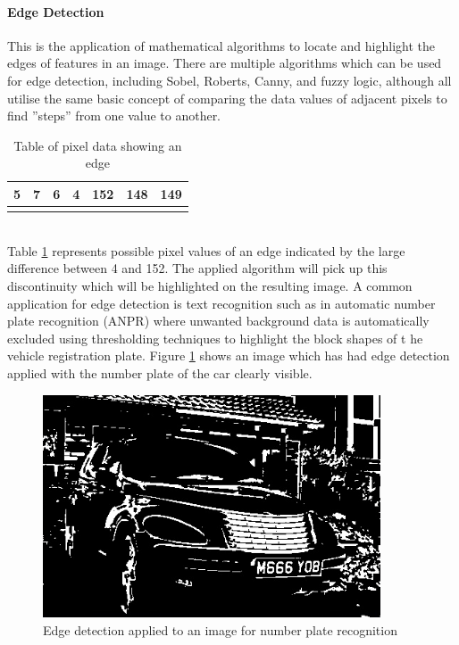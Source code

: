 	\paragraph{Edge Detection}
	This is the application of mathematical algorithms to locate and highlight the edges of features in an image. There are multiple algorithms which can be used for edge detection, including Sobel, Roberts, Canny, and fuzzy logic, although all utilise the same basic concept of comparing the data values of adjacent pixels to find ”steps” from one value to another.
	\begin{table}[h!]
		\centering
		\caption{Table of pixel data showing an edge}
		\label{tab:edgePixels}
		\begin{tabular}{|c|c|c|c|c|c|c|}
			\hline
			5&7&6&4&152&148&149\\
			\hline
			\cellcolor[HTML]{0D0D0D}&
			\cellcolor[HTML]{121212}&
			\cellcolor[HTML]{0F0F0F}&
			\cellcolor[HTML]{0a0a0a}&
			\cellcolor[HTML]{989898}&
			\cellcolor[HTML]{949494}&
			\cellcolor[HTML]{959595}\\
			\hline
		\end{tabular}
	\end{table}\\
	Table \ref{tab:edgePixels} represents possible pixel values of an edge indicated by the large difference between 4 and 152. The applied algorithm will pick up this discontinuity which will be highlighted on the resulting image. A common application for edge detection is text recognition such as in automatic number plate recognition (ANPR) \citep{anpr} where unwanted background data is automatically excluded using thresholding techniques to highlight the block shapes of t he vehicle registration plate. Figure \ref{fig:anpr} shows an image which has had edge detection applied with the number plate of the car clearly visible.
	\begin{figure}[h!]
		\centering
		\includegraphics[width=10cm]{../images/anpr.jpg}
		\caption{Edge detection applied to an image for number plate recognition}
		\label{fig:anpr}
	\end{figure} 
